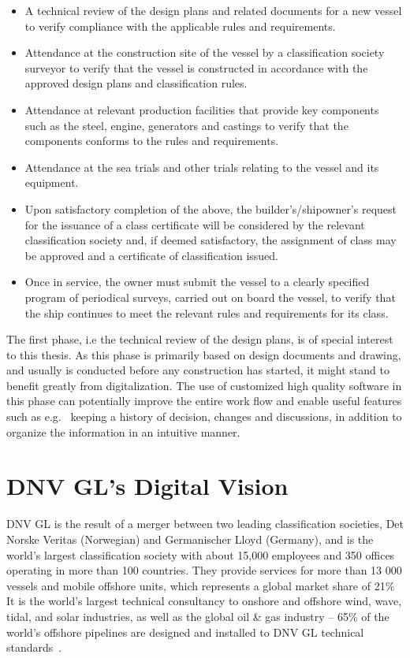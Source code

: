 \begin{itemize}
	\item A technical review of the design plans and related documents for a new vessel to verify compliance with the applicable rules and requirements.
	\item Attendance at the construction site of the vessel by a classification society surveyor to verify that the vessel is 
		  constructed in accordance with the approved design plans and classification rules.
	\item Attendance at relevant production facilities that provide key components such as the steel, engine, generators and castings to verify that the components conforms to
		  the rules and requirements.
	\item Attendance at the sea trials and other trials relating to the vessel and its equipment.
	\item Upon satisfactory completion of the above, the builder’s/shipowner’s request for the issuance of a class certificate will be considered by the 
		  relevant classification society and, if deemed satisfactory, the assignment of class may be approved and a certificate of classification issued.
	\item Once in service, the owner must submit the vessel to a clearly specified program of periodical surveys, carried out on board the vessel, 
		  to verify that the ship continues to meet the relevant rules and requirements for its class.
\end{itemize}

The first phase, i.e the technical review of the design plans, is of special interest to this thesis. 
As this phase is primarily based on design documents and drawing, and usually is conducted before any construction has started, it might stand to benefit greatly from
digitalization. The use of customized high quality software in this phase can potentially improve the entire work flow and enable useful features such as e.g.~ keeping a 
history of decision, changes and discussions, in addition to organize the information in an intuitive manner. 


\section{DNV GL's Digital Vision}
DNV GL is the result of a merger between two leading classification societies, Det Norske Veritas (Norwegian) and Germanischer Lloyd (Germany),
and is the world's largest classification society with about 15,000 employees and 350 offices operating in more than 100 countries. 
They provide services for more than 13 000 vessels and mobile offshore units, which represents a global market share of 21\%~\citep{TO:DNVGL}
It is the world's largest technical consultancy to onshore and offshore wind, wave, tidal, and solar industries, as well as the global oil \& gas industry 
-- 65\% of the world’s offshore pipelines are designed and installed to DNV GL technical standards~\citep{MTN:DNVGL}. 

